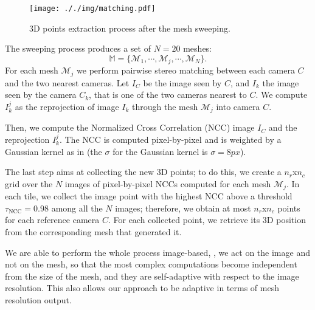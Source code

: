 \begin{figure}[t]
  \centering
  \texttt{[image: ././img/matching.pdf]}
\caption{3D points extraction process after the mesh sweeping.}
  \label{fig:matching}
\end{figure}


The sweeping process produces a set of $N = 20$ meshes:
\[
    \mathbb{M} = \{\mathcal{M}_1, \cdots, \mathcal{M}_j ,\cdots, \mathcal{M}_N\}.
\]
For each mesh $\mathcal{M}_j$ we perform pairwise stereo matching between each camera $C$ and the two nearest cameras.
Let $I_C$ be the image seen by $C$, and $I_k$ the image seen by the camera $C_k$, that is one of the two cameras nearest to $C$. 
We compute $I_k^j$ as the reprojection of image $I_k$ through the mesh $\mathcal{M}_j$ into camera $C$.


Then, we compute  the Normalized Cross Correlation (NCC) image $I_C$ and the reprojection $I_k^j$. 
The NCC is computed pixel-by-pixel and is weighted by a Gaussian kernel as in \cite{pons2007multi}  (the $\sigma$ for the Gaussian kernel is $\sigma = 8 px$).

The last step aims at collecting the new 3D points; to do this, we create a $n_r$x$n_c$ grid over the $N$ images of pixel-by-pixel NCCs computed for each mesh $\mathcal{M}_j$.  In each tile, we collect the image point with the highest NCC above a threshold $\tau_{\text{NCC}} = 0.98$ among all the $N$ images; therefore, we obtain at most $n_r$x$n_c$ points for each reference camera $C$.
For each collected point, we retrieve its 3D position from the corresponding mesh that generated it.

We are able to perform the whole process image-based, \ie, we act on the image and not on the mesh, so that the most complex computations become independent from the size of the mesh, and they are self-adaptive with respect to the  image resolution. This also allows our approach to be adaptive in terms of mesh resolution output.

